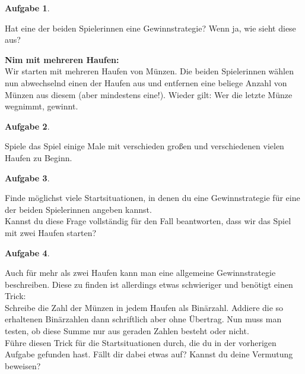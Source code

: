 \documentclass[a4paper,ngerman,12pt]{scrartcl}
\theoremstyle{definition}
\newtheorem{aufg}{Aufgabe}
\newenvironment{aufgabe}[1][]
		{\begin{shaded}\vspace{-0.3cm}\begin{aufg}\emph{#1} \par\medskip}
		{\end{aufg}\vspace{-0.3cm}\end{shaded}}
\newenvironment{spiel}[1][]{\begin{framed}\textbf{#1:}\\}{\end{framed}}
\theoremstyle{plain}
\theoremstyle{remark}
\begin{document}
\begin{aufgabe}
	Hat eine der beiden Spielerinnen eine Gewinnstrategie? Wenn ja, wie sieht diese aus?
\end{aufgabe}


\newpage
\begin{spiel}[Nim mit mehreren Haufen]
	Wir starten mit mehreren Haufen von Münzen. Die beiden Spielerinnen wählen nun abwechselnd einen der Haufen aus und entfernen eine beliege Anzahl von Münzen aus diesem (aber mindestens eine!). Wieder gilt: Wer die letzte Münze wegnimmt, gewinnt.
\end{spiel}

\begin{aufgabe}
	Spiele das Spiel einige Male mit verschieden großen und verschiedenen vielen Haufen zu Beginn.
\end{aufgabe}

\begin{aufgabe}
	Finde möglichst viele Startsituationen, in denen du eine Gewinnstrategie für eine der beiden Spielerinnen angeben kannst. \\
	Kannst du diese Frage vollständig für den Fall beantworten, dass wir das Spiel mit zwei Haufen starten?
\end{aufgabe}


\begin{aufgabe}
	Auch für mehr als zwei Haufen kann man eine allgemeine Gewinnstrategie beschreiben. Diese zu finden ist allerdings etwas schwieriger und benötigt einen Trick: \\
	Schreibe die Zahl der Münzen in jedem Haufen als Binärzahl. Addiere die so erhaltenen Binärzahlen dann schriftlich aber ohne Übertrag. Nun muss man testen, ob diese \glqq Summe\grqq{} nur aus geraden Zahlen besteht oder nicht. \\
	Führe diesen Trick für die Startsituationen durch, die du in der vorherigen Aufgabe gefunden hast. Fällt dir dabei etwas auf? Kannst du deine Vermutung beweisen?
\end{aufgabe}
\end{document}
